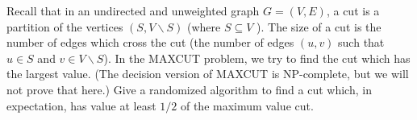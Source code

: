 \documentclass[solutionorbox,answers]{exam}
\begin{document}
\begin{questions}
\newpage

\question Recall that in an undirected and unweighted graph $G = (V,E)$, a cut is a partition of the vertices
$(S, V \backslash S)$ (where $S \subseteq V$ ). The size of a cut is the number of edges which cross the cut (the number of
edges $(u, v)$ such that $u \in S$ and $v \in V \backslash S$). In the MAXCUT problem, we try to find the cut which has
the largest value. (The decision version of MAXCUT is NP-complete, but we will not prove that here.)
Give a randomized algorithm to find a cut which, in expectation, has value at least $1/2$ of the maximum
value cut.

  \begin{solutionbox}{} \vspace{1em} 


  \end{solutionbox}

\end{questions}
\end{document}
